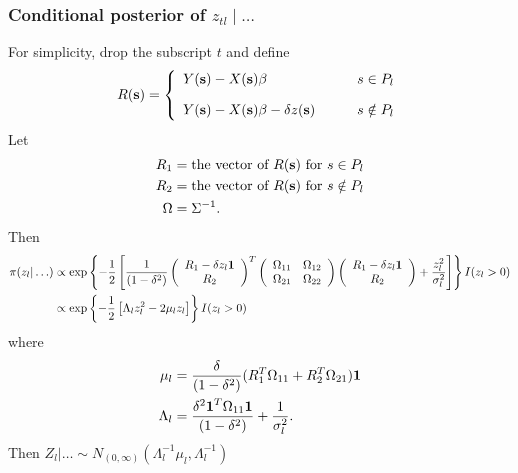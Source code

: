 \subsubsection*{Conditional posterior of $z_{tl} \mid \ldots $}\label{s:mvcondu}
For simplicity, drop the subscript $t$ and define 
\begin{align*}
R(\mbox{\bf s}) = \left\{ 
    \begin{array}{ll}
        Y(\mbox{\bf s}) - X(\mbox{\bf s}) \beta &s \in P_l\\[1em]
        Y(\mbox{\bf s}) - X(\mbox{\bf s}) \beta - \delta z(\mbox{\bf s}) \qquad & s \notin P_l
    \end{array} 
\right.
\end{align*}
Let 
\begin{align*}
    R_1 &= \text{the vector of } R(\mbox{\bf s}) \text{ for } s \in P_l \\
    R_2 &= \text{the vector of } R(\mbox{\bf s}) \text{ for } s \notin P_l \\
    \Omega &= \Sigma^{-1}.
\end{align*}
Then
\begin{align*}
    \pi(z_l | \ldots) &\propto \exp \left\{ -\frac{ 1 }{ 2 } \left[ \frac{ 1 }{ (1 - \delta^2)}
        \left( \begin{array}{c}
            R_1 - \delta z_l \mbox{\boldmath $1$}\\
            R_2
        \end{array} \right)^T
        \left( \begin{array}{cc}
            \Omega_{11} & \Omega_{12}\\
            \Omega_{21} & \Omega_{22}
        \end{array} \right)
        \left( \begin{array}{c}
            R_1 - \delta z_l \mbox{\boldmath $1$}\\
            R_2
        \end{array} \right)
        +  \frac{ z_l^2 }{ \sigma_l^2 }\right]
    \right\} I(z_l > 0) \\
        &\propto \exp \left\{ -\frac{ 1 }{ 2 } \left[ \Lambda_l z_l^2 - 2 \mu_l z_l \right] \right\} I(z_l > 0)
\end{align*}
where
\begin{align*}
    \mu_l &= \frac{ \delta}{(1 - \delta^2)} ( R_1^T \Omega_{11} + R_2^T \Omega_{21} )\mbox{\boldmath $1$}\\
    \Lambda_l &= \frac{\delta^2 \mbox{\boldmath $1$}^T \Omega_{11} \mbox{\boldmath $1$} }{ (1 - \delta^2) } + \frac{ 1 }{ \sigma^2_l }.
\end{align*}
Then $Z_l | \ldots \sim N_{(0, \infty)} (\Lambda_l^{-1} \mu_l, \Lambda_l^{-1})$